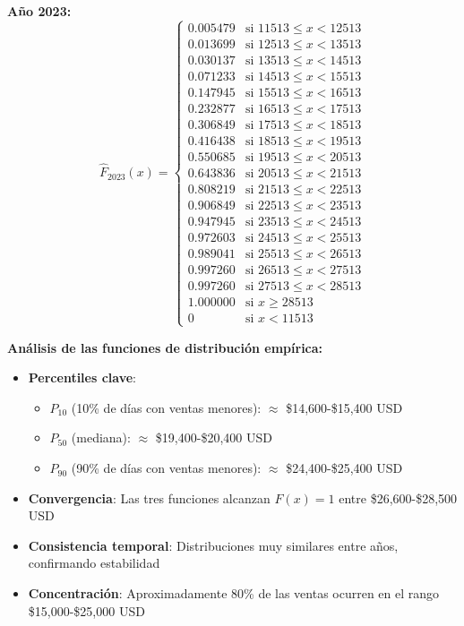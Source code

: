 \documentclass[11pt,a4paper]{article}
\begin{document}
\textbf{Año 2023:}
\[
\hat{F}_{2023}(x) = \begin{cases}
0.005479 & \text{si } 11513 \leq x < 12513 \\
0.013699 & \text{si } 12513 \leq x < 13513 \\
0.030137 & \text{si } 13513 \leq x < 14513 \\
0.071233 & \text{si } 14513 \leq x < 15513 \\
0.147945 & \text{si } 15513 \leq x < 16513 \\
0.232877 & \text{si } 16513 \leq x < 17513 \\
0.306849 & \text{si } 17513 \leq x < 18513 \\
0.416438 & \text{si } 18513 \leq x < 19513 \\
0.550685 & \text{si } 19513 \leq x < 20513 \\
0.643836 & \text{si } 20513 \leq x < 21513 \\
0.808219 & \text{si } 21513 \leq x < 22513 \\
0.906849 & \text{si } 22513 \leq x < 23513 \\
0.947945 & \text{si } 23513 \leq x < 24513 \\
0.972603 & \text{si } 24513 \leq x < 25513 \\
0.989041 & \text{si } 25513 \leq x < 26513 \\
0.997260 & \text{si } 26513 \leq x < 27513 \\
0.997260 & \text{si } 27513 \leq x < 28513 \\
1.000000 & \text{si } x \geq 28513 \\
0 & \text{si } x < 11513
\end{cases}
\]

\textbf{Análisis de las funciones de distribución empírica:}
\begin{itemize}
    \item \textbf{Percentiles clave}:
    \begin{itemize}
        \item $P_{10}$ (10\% de días con ventas menores): $\approx$ \$14,600-\$15,400 USD
        \item $P_{50}$ (mediana): $\approx$ \$19,400-\$20,400 USD  
        \item $P_{90}$ (90\% de días con ventas menores): $\approx$ \$24,400-\$25,400 USD
    \end{itemize}
    \item \textbf{Convergencia}: Las tres funciones alcanzan $F(x) = 1$ entre \$26,600-\$28,500 USD
    \item \textbf{Consistencia temporal}: Distribuciones muy similares entre años, confirmando estabilidad
    \item \textbf{Concentración}: Aproximadamente 80\% de las ventas ocurren en el rango \$15,000-\$25,000 USD
\end{itemize}
\end{document}
